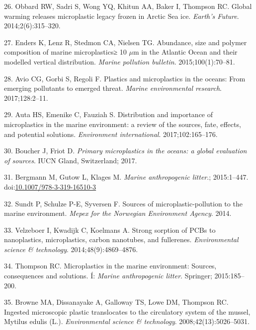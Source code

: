 \documentclass[icelandic,]{book}
\begin{document}
\leavevmode\hypertarget{ref-obbard2014global}{}%
26. Obbard RW, Sadri S, Wong YQ, Khitun AA, Baker I, Thompson RC. Global warming releases microplastic legacy frozen in Arctic Sea ice. \emph{Earth's Future}. 2014;2(6):315--320.

\leavevmode\hypertarget{ref-enders2015abundance}{}%
27. Enders K, Lenz R, Stedmon CA, Nielsen TG. Abundance, size and polymer composition of marine microplastics≥ 10 \(\mu\)m in the Atlantic Ocean and their modelled vertical distribution. \emph{Marine pollution bulletin}. 2015;100(1):70--81.

\leavevmode\hypertarget{ref-avio2017plastics}{}%
28. Avio CG, Gorbi S, Regoli F. Plastics and microplastics in the oceans: From emerging pollutants to emerged threat. \emph{Marine environmental research}. 2017;128:2--11.

\leavevmode\hypertarget{ref-auta2017distribution}{}%
29. Auta HS, Emenike C, Fauziah S. Distribution and importance of microplastics in the marine environment: a review of the sources, fate, effects, and potential solutions. \emph{Environment international}. 2017;102:165--176.

\leavevmode\hypertarget{ref-boucher2017primary}{}%
30. Boucher J, Friot D. \emph{Primary microplastics in the oceans: a global evaluation of sources}. IUCN Gland, Switzerland; 2017.

\leavevmode\hypertarget{ref-Bergmann2015}{}%
31. Bergmann M, Gutow L, Klages M. \emph{Marine anthropogenic litter}.; 2015:1--447. doi:\href{https://doi.org/10.1007/978-3-319-16510-3}{10.1007/978-3-319-16510-3}

\leavevmode\hypertarget{ref-sundt2014sources}{}%
32. Sundt P, Schulze P-E, Syversen F. Sources of microplastic-pollution to the marine environment. \emph{Mepex for the Norwegian Environment Agency}. 2014.

\leavevmode\hypertarget{ref-velzeboer2014strong}{}%
33. Velzeboer I, Kwadijk C, Koelmans A. Strong sorption of PCBs to nanoplastics, microplastics, carbon nanotubes, and fullerenes. \emph{Environmental science \& technology}. 2014;48(9):4869--4876.

\leavevmode\hypertarget{ref-thompson2015microplastics}{}%
34. Thompson RC. Microplastics in the marine environment: Sources, consequences and solutions. Í: \emph{Marine anthropogenic litter}. Springer; 2015:185--200.

\leavevmode\hypertarget{ref-browne2008ingested}{}%
35. Browne MA, Dissanayake A, Galloway TS, Lowe DM, Thompson RC. Ingested microscopic plastic translocates to the circulatory system of the mussel, Mytilus edulis (L.). \emph{Environmental science \& technology}. 2008;42(13):5026--5031.
\end{document}
